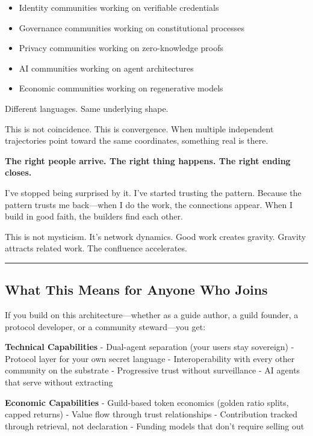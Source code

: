 \documentclass[
]{article}
\providecommand{\tightlist}{%
  \setlength{\itemsep}{0pt}\setlength{\parskip}{0pt}}
\begin{document}
\begin{itemize}
\tightlist
\item
  Identity communities working on verifiable credentials
\item
  Governance communities working on constitutional processes
\item
  Privacy communities working on zero-knowledge proofs
\item
  AI communities working on agent architectures
\item
  Economic communities working on regenerative models
\end{itemize}

Different languages. Same underlying shape.

This is not coincidence. This is convergence. When multiple independent
trajectories point toward the same coordinates, something real is there.

\textbf{The right people arrive. The right thing happens. The right
ending closes.}

I've stopped being surprised by it. I've started trusting the pattern.
Because the pattern trusts me back---when I do the work, the connections
appear. When I build in good faith, the builders find each other.

This is not mysticism. It's network dynamics. Good work creates gravity.
Gravity attracts related work. The confluence accelerates.

\begin{center}\rule{0.5\linewidth}{0.5pt}\end{center}

\subsection{What This Means for Anyone Who
Joins}\label{what-this-means-for-anyone-who-joins}

If you build on this architecture---whether as a guide author, a guild
founder, a protocol developer, or a community steward---you get:

\textbf{Technical Capabilities} - Dual-agent separation (your users stay
sovereign) - Protocol layer for your own secret language -
Interoperability with every other community on the substrate -
Progressive trust without surveillance - AI agents that serve without
extracting

\textbf{Economic Capabilities} - Guild-based token economics (golden
ratio splits, capped returns) - Value flow through trust relationships -
Contribution tracked through retrieval, not declaration - Funding models
that don't require selling out
\end{document}
